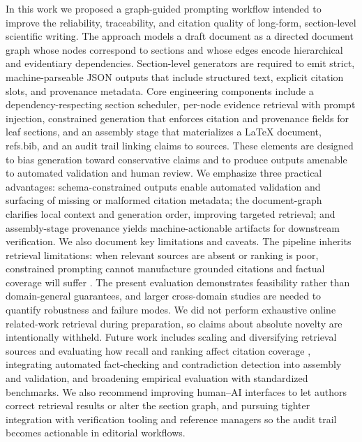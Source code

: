 In this work we proposed a graph-guided prompting workflow intended to improve the reliability, traceability, and citation quality of long-form, section-level scientific writing.
The approach models a draft document as a directed document graph whose nodes correspond to sections and whose edges encode hierarchical and evidentiary dependencies.
Section-level generators are required to emit strict, machine-parseable JSON outputs that include structured text, explicit citation slots, and provenance metadata.
Core engineering components include a dependency-respecting section scheduler, per-node evidence retrieval with prompt injection, constrained generation that enforces citation and provenance fields for leaf sections, and an assembly stage that materializes a LaTeX document, refs.bib, and an audit trail linking claims to sources.
These elements are designed to bias generation toward conservative claims and to produce outputs amenable to automated validation and human review.
We emphasize three practical advantages: schema-constrained outputs enable automated validation and surfacing of missing or malformed citation metadata; the document-graph clarifies local context and generation order, improving targeted retrieval; and assembly-stage provenance yields machine-actionable artifacts for downstream verification.
We also document key limitations and caveats.
The pipeline inherits retrieval limitations: when relevant sources are absent or ranking is poor, constrained prompting cannot manufacture grounded citations and factual coverage will suffer \cite{web_deng_2025_the_next_phase_of_scientific_fact_checking_advan}.
The present evaluation demonstrates feasibility rather than domain-general guarantees, and larger cross-domain studies are needed to quantify robustness and failure modes.
We did not perform exhaustive online related-work retrieval during preparation, so claims about absolute novelty are intentionally withheld.
Future work includes scaling and diversifying retrieval sources and evaluating how recall and ranking affect citation coverage \cite{web_deng_2025_the_next_phase_of_scientific_fact_checking_advan}, integrating automated fact-checking and contradiction detection into assembly and validation, and broadening empirical evaluation with standardized benchmarks.
We also recommend improving human--AI interfaces to let authors correct retrieval results or alter the section graph, and pursuing tighter integration with verification tooling and reference managers so the audit trail becomes actionable in editorial workflows.